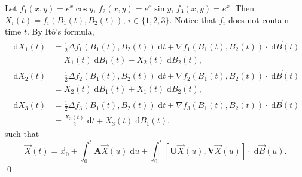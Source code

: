 \documentclass{MFM-hw} %
\newcommand{\dd}{\;\mathrm{d}}
\newcommand{\Ito}{It\^{o}}
\begin{document}
Let $f_1(x, y) = e^x \cos y$, $f_2(x,y) = e^x \sin y$, $f_3(x,y) = e^x$. Then $X_i(t) = f_i(B_1(t), B_2(t))$, $i \in \{1,2,3\}$. Notice that $f_i$ does not contain time $t$. By \Ito's formula,
\begin{align*}
    \dd X_1(t) &= \frac{1}{2} \Delta f_1(B_1(t),B_2(t)) \dd t + \nabla f_1(B_1(t), B_2(t)) \cdot \dd \vec{B}(t) \\
    & = X_1(t) \dd B_1(t) - X_2(t) \dd B_2(t),
\end{align*}
\begin{align*}
    \dd X_2(t) &= \frac{1}{2} \Delta f_2(B_1(t),B_2(t)) \dd t + \nabla f_2(B_1(t), B_2(t)) \cdot \dd \vec{B}(t) \\
    & = X_2(t) \dd B_1(t) + X_1(t) \dd B_2(t),
\end{align*}
\begin{align*}
    \dd X_3(t) &= \frac{1}{2} \Delta f_3(B_1(t),B_2(t)) \dd t + \nabla f_3(B_1(t), B_2(t)) \cdot \dd \vec{B}(t) \\
    & = \frac{X_3(t)}{2} \dd t + X_3(t) \dd B_1(t),
\end{align*}
such that
\[
    \vec{X}(t) = \vec{x}_0 + \int_0^t\boldsymbol{A} \vec{X}(u) \dd u + \int_0^t \left[\boldsymbol{U} \vec{X}(u) , \boldsymbol{V} \vec{X}(u) \right] \cdot \dd \vec{B}(u).
\]\qed
\end{document}
